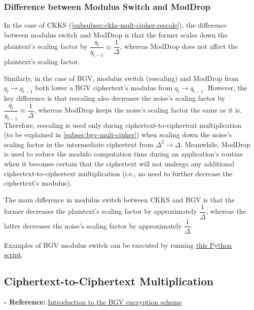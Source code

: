 \subsubsection{Difference between Modulus Switch and \textsf{ModDrop}}
\label{subsubsec:bgv-moddrop-vs-modswitch}

In the case of CKKS (\autoref{subsubsec:ckks-mult-cipher-rescale}), the difference between modulus switch and \textsf{ModDrop} is that the former scales down the plaintext's scaling factor by $\dfrac{q_l}{q_{l-1}} \approx \dfrac{1}{\Delta}$, whereas \textsf{ModDrop} does not affect the plaintext's scaling factor. 

Similarly, in the case of BGV, modulus switch (rescaling) and \textsf{ModDrop} from $q_l \rightarrow q_{l-1}$ both lower a BGV ciphertext's modulus from $q_l \rightarrow q_{l-1}$. However, the key difference is that rescaling also decreases the noise's scaling factor by $\dfrac{q_l}{q_{l-1}} \approx \dfrac{1}{\Delta}$, whereas \textsf{ModDrop} keeps the noise's scaling factor the same as it is. Therefore, rescaling is used only during ciphertext-to-ciphertext multiplication (to be explained in \autoref{subsec:bgv-mult-cipher}) when scaling down the noise's scaling factor in the intermediate ciphertext from $\Delta^2 \rightarrow \Delta$. Meanwhile, \textsf{ModDrop} is used to reduce the modulo computation time during an application's routine when it becomes certain that the ciphertext will not undergo any additional ciphertext-to-ciphertext multiplication (i.e., no need to further decrease the ciphertext's modulus). 

The main difference in modulus switch between CKKS and BGV is that the former decreases the plaintext's scaling factor by approximately $\dfrac{1}{\Delta}$, whereas the latter decreases the noise's scaling factor by approximately $\dfrac{1}{\Delta}$. 

 Examples of BGV modulus switch can be executed by running \href{https://github.com/fhetextbook/fhe-textbook/blob/main/source%20code/bgv.py}{\underline{this Python script}}. 


\subsection{Ciphertext-to-Ciphertext Multiplication}
\label{subsec:bgv-mult-cipher}

\noindent \textbf{- Reference:} 
\href{https://www.inferati.com/blog/fhe-schemes-bgv}{Introduction to the BGV encryption scheme}

